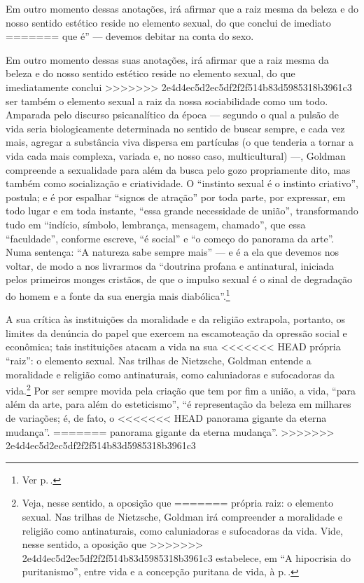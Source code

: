 Em outro momento dessas anotações, irá afirmar que a raiz mesma da beleza e do nosso
sentido estético reside no elemento sexual, do que conclui de imediato
=======
que é'' --- devemos debitar na conta do sexo. 

Em outro momento dessas
suas anotações, irá afirmar que a raiz mesma da beleza e do nosso
sentido estético reside no elemento sexual, do que imediatamente conclui
>>>>>>> 2e4d4ec5d2ec5df2f2f514b83d5985318b3961c3
ser também o elemento sexual a raiz da nossa sociabilidade como um todo.
Amparada pelo discurso psicanalítico da época --- segundo o qual a pulsão
de vida seria biologicamente determinada no sentido de buscar sempre, e
cada vez mais, agregar a substância viva dispersa em partículas (o que
tenderia a tornar a vida cada mais complexa, variada e, no nosso caso,
multicultural) ---, Goldman compreende a sexualidade para além da busca
pelo gozo propriamente dito, mas também como socialização e criatividade. O
``instinto sexual é o instinto criativo'', postula; e é por espalhar
``signos de atração'' por toda parte, por expressar, em todo lugar e em
toda instante, ``essa grande necessidade de união'', transformando tudo
em ``indício, símbolo, lembrança, mensagem, chamado'', que essa
``faculdade'', conforme escreve, ``é social'' e ``o começo do panorama
da arte''. Numa sentença: ``A natureza sabe sempre mais'' --- e é a ela
que devemos nos voltar, de modo a nos livrarmos da ``doutrina profana e
antinatural, iniciada pelos primeiros monges cristãos, de que o impulso
sexual é o sinal de degradação do homem e a fonte da sua energia mais
diabólica''.\footnote{Ver p.\,\pageref{diabolica}.}

A sua crítica às instituições da moralidade e da religião extrapola,
portanto, os limites da denúncia do papel que exercem na escamoteação da
opressão social e econômica; tais instituições atacam a vida na sua
<<<<<<< HEAD
própria ``raiz'': o elemento sexual. Nas trilhas de Nietzsche, Goldman
entende a moralidade e religião como antinaturais, como
caluniadoras e sufocadoras da vida.\footnote{Veja, nesse sentido, a oposição que
=======
própria raiz: o elemento sexual. Nas trilhas de Nietzsche, Goldman
irá compreender a moralidade e religião como antinaturais, como
caluniadoras e sufocadoras da vida. Vide, nesse sentido, a oposição que
>>>>>>> 2e4d4ec5d2ec5df2f2f514b83d5985318b3961c3
estabelece, em ``A hipocrisia do puritanismo'', entre vida e a concepção
puritana de vida, à p.\,\pageref{hipocrisia}.} Por ser sempre movida pela criação que tem por fim a
união, a vida, ``para além da arte, para além do esteticismo'',
``é representação da beleza em milhares de variações; é, de fato, o
<<<<<<< HEAD
panorama gigante da eterna mudança''.
=======
panorama gigante da eterna mudança''. 
>>>>>>> 2e4d4ec5d2ec5df2f2f514b83d5985318b3961c3

